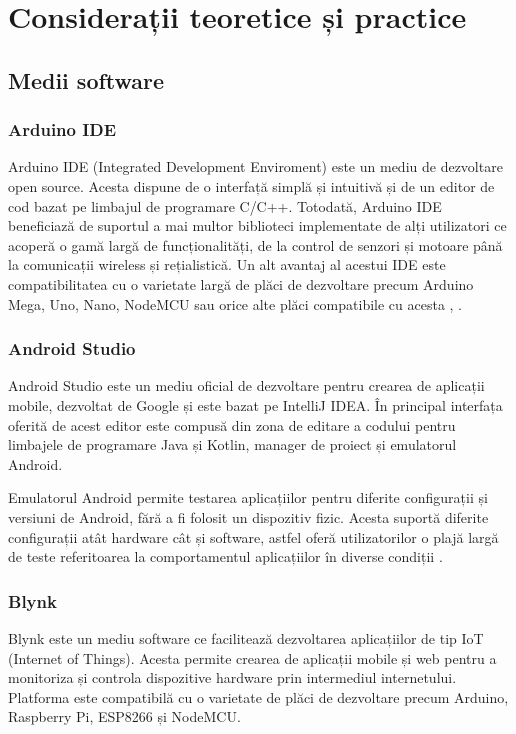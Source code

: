 \chapter{Considerații teoretice și practice}
\thispagestyle{pagestyle}

\section{Medii software}
\subsection{Arduino IDE}

Arduino IDE (Integrated Development Enviroment) este un mediu de dezvoltare open source. Acesta dispune de o interfață simplă și intuitivă și de un editor de cod bazat pe limbajul de programare C/C++. Totodată, Arduino IDE beneficiază de suportul a mai multor biblioteci implementate de alți utilizatori ce acoperă o gamă largă de funcționalități, de la control de senzori și motoare până la comunicații wireless și rețialistică. Un alt avantaj al acestui IDE este compatibilitatea cu o varietate largă de plăci de dezvoltare precum Arduino Mega, Uno, Nano, NodeMCU sau orice alte plăci compatibile cu acesta \cite{arduino_ide}, \cite{arduino_ide_doc}.

\subsection{Android Studio}
Android Studio este un mediu oficial de dezvoltare pentru crearea de aplicații mobile, dezvoltat de Google și este bazat pe IntelliJ IDEA. În principal interfața oferită de acest editor este compusă din zona de editare a codului pentru limbajele de programare Java și Kotlin, manager de proiect și emulatorul Android.

Emulatorul Android permite testarea aplicațiilor pentru diferite configurații și versiuni de Android, fără a fi folosit un dispozitiv fizic. Acesta suportă diferite configurații atât hardware cât și software, astfel oferă utilizatorilor o plajă largă de teste referitoarea la comportamentul aplicațiilor în diverse condiții \cite{android_studio_doc}.


\subsection{Blynk}
Blynk este un mediu software ce facilitează dezvoltarea aplicațiilor de tip IoT (Internet of Things). Acesta permite crearea de aplicații mobile și web pentru a monitoriza și controla dispozitive hardware prin intermediul internetului. Platforma este compatibilă cu o varietate de plăci de dezvoltare precum  Arduino, Raspberry Pi, ESP8266 și NodeMCU. 

